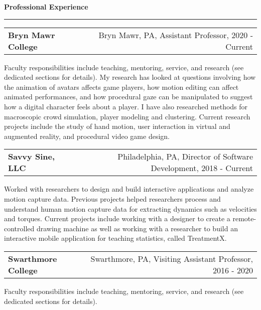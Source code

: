 \needspace{6em}
{\Large {\bf Professional Experience}} 
\vspace{0.1cm}
\hrule
\medskip

\needspace{6em}
\begin{tabular*}{7.1in}{@{}l@{\extracolsep\fill}r}
{\large {\bf Bryn Mawr College}} & Bryn Mawr, PA, Assistant Professor, 2020 - Current\\
\end{tabular*}

Faculty responsibilities include teaching, mentoring, service, and research
(see dedicated sections for details).  My research has looked at questions
involving how the animation of avatars affects game players, how motion editing
can affect animated performances, and how procedural gaze can be manipulated to
suggest how a digital character feels about a player. I have also researched
methods for macroscopic crowd simulation, player modeling and clustering.
Current research projects include the study of hand motion, user interaction in
virtual and augmented reality, and procedural video game design. 

\medskip
\medskip


\needspace{6em}
\begin{tabular*}{7.1in}{@{}l@{\extracolsep\fill}r}
{\large {\bf Savvy Sine, LLC}} & Philadelphia, PA, Director of Software Development, 2018 - Current\\
\end{tabular*}

Worked with researchers to design and build interactive
applications and analyze motion capture data. 
Previous projects helped researchers process and
understand human motion capture data for extracting dynamics such as velocities
and torques. Current projects include working with a designer to create a
remote-controlled drawing machine as well as working with a researcher to build
an interactive mobile application for teaching statistics, called TreatmentX.  

\medskip
\medskip

\needspace{6em}
\begin{tabular*}{7.1in}{@{}l@{\extracolsep\fill}r}
{\large {\bf Swarthmore College}} & Swarthmore, PA, Visiting Assistant Professor, 2016 - 2020\\
\end{tabular*}

Faculty responsibilities include teaching, mentoring, service, and research
(see dedicated sections for details).  

